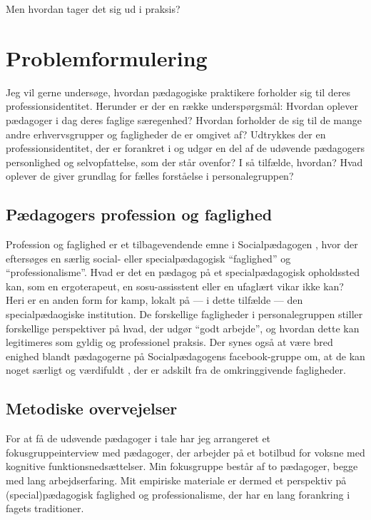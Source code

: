 
Men hvordan tager det sig ud i praksis?

\section{Problemformulering}
Jeg vil gerne undersøge, hvordan pædagogiske praktikere forholder sig til deres professionsidentitet.
Herunder er der en række underspørgsmål:
Hvordan oplever pædagoger i dag deres faglige særegenhed?
Hvordan forholder de sig til de mange andre erhvervsgrupper og fagligheder de er omgivet af?
Udtrykkes der en professionsidentitet, der er forankret i og udgør en del af de udøvende pædagogers personlighed og selvopfattelse, som der står ovenfor?
I så tilfælde, hvordan?
Hvad oplever de giver grundlag for fælles forståelse i personalegruppen?

\subsection{Pædagogers profession og faglighed}
Profession og faglighed er et tilbagevendende emne i Socialpædagogen \autocite[fx]{petersenHvadSigerEksperten2019}, hvor der eftersøges en særlig social- eller specialpædagogisk “faglighed” og “professionalisme”.
Hvad er det en pædagog på et specialpædagogisk opholdssted kan, som en ergoterapeut, en sosu-assisstent eller en ufaglært vikar ikke kan?
Heri er en anden form for kamp, lokalt på — i dette tilfælde — den specialpædaogiske institution.
De forskellige fagligheder i personalegruppen stiller forskellige perspektiver på hvad, der udgør “godt arbejde”, og hvordan dette kan legitimeres som gyldig og professionel praksis. 
Der synes også at være bred enighed blandt pædagogerne på Socialpædagogens facebook-gruppe om, at de kan noget særligt og værdifuldt \autocite{petersenSlagsMenneskeligAltmuligmand2019}, der er adskilt fra de omkringgivende fagligheder.

\subsection{Metodiske overvejelser}

For at få de udøvende pædagoger i tale har jeg arrangeret et fokusgruppeinterview med pædagoger, der arbejder på et botilbud for voksne med kognitive funktionsnedsættelser.
Min fokusgruppe består af to pædagoger, begge med lang arbejdserfaring.
Mit empiriske materiale er dermed et perspektiv på (special)pædagogisk faglighed og professionalisme, der har en lang forankring i fagets traditioner.

